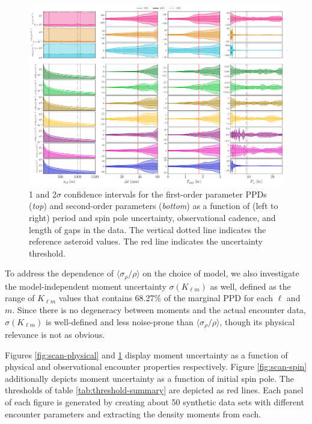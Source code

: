 \documentclass[fleqn,usenatbib]{mnras}
\begin{document}
\begin{figure}
  \centering
  \includegraphics[angle=90, origin=c, width=0.98\linewidth]{figs/scan-all2.pdf}
  \caption{1 and 2$\sigma$ confidence intervals for the first-order parameter PPDs (\textit{top}) and second-order parameters (\textit{bottom}) as a function of (left to right) period and spin pole uncertainty, observational cadence, and length of gaps in the data. The vertical dotted line indicates the reference asteroid values. The red line indicates the uncertainty threshold.}
    \label{fig:scan-rho}
    \label{fig:scan-theta}
    \label{fig:scan-cadence}
    \label{fig:observation-gap}
    \label{fig:scan-observational}
\end{figure}


To address the dependence of $\langle \sigma_\rho / \rho \rangle$ on the choice of model, we also investigate the model-independent moment uncertainty $\sigma(K_{\ell m})$ as well, defined as the range of $K_{\ell m}$ values that contains 68.27\% of the marginal PPD for each $\ell$ and $m$. Since there is no degeneracy between moments and the actual encounter data, $\sigma(K_{\ell m})$ is well-defined and less noise-prone than $\langle \sigma_\rho / \rho \rangle$, though its physical relevance is not as obvious.

Figures \ref{fig:scan-physical} and \ref{fig:scan-observational} display moment uncertainty as a function of physical and observational encounter properties respectively. Figure \ref{fig:scan-spin} additionally depicts moment uncertainty as a function of initial spin pole. The thresholds of table \ref{tab:threshold-summary} are depicted as red lines. Each panel of each figure is generated by creating about 50 synthetic data sets with different encounter parameters and extracting the density moments from each.
\end{document}
